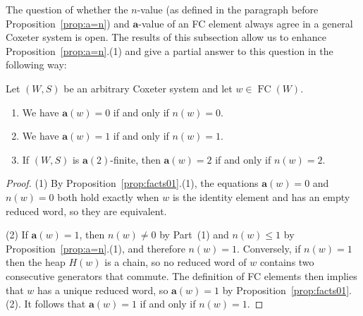 \documentclass[ALCO,Unicode,published]{cedram}
\newcommand{\la}{\mathbf{a}}
\DeclareMathOperator{\fc}{\mathrm{FC}}
\begin{document}
    \begin{remark}
      \label{rmk:a.vs.n}
      The question of whether the $n$-value (as defined in the paragraph before Proposition~\ref{prop:a=n}) and
      $\la$-value of an FC element always agree in a general Coxeter system is open. The results of
      this subsection allow us to enhance Proposition~\ref{prop:a=n}.(1) and give a partial answer to this
      question in the following way: 

\begin{prop} 
\label{prop:a.vs.n}
Let $(W,S)$ be an arbitrary Coxeter system and let $w\in \fc(W)$.  \begin{enumerate} \item We
   have $\la(w)=0$ if and only if $n(w)=0$.  \item We have $\la(w)=1$ if and only if
   $n(w)=1$.
\item If $(W,S)$ is $\la(2)$-finite, then $\la(w)=2$ if and only if $n(w)=2$.  \end{enumerate}
  \end{prop} 
\begin{proof} (1) By Proposition~\ref{prop:facts01}.(1), the equations $\la(w)=0$ and $n(w)=0$ both hold
     exactly when $w$ is the identity element and has an empty reduced word, so they are
     equivalent.

(2) If $\la(w)=1$, then $n(w)\neq 0$ by Part~(1) and $n(w)\le 1$ by Proposition~\ref{prop:a=n}.(1), and
therefore $n(w)=1$.  Conversely, if $n(w)=1$ then the heap $H(w)$ is a chain, so no reduced word
of $w$ contains two consecutive generators that commute. The definition of FC elements then
implies that $w$ has a unique reduced word, so $\la(w)=1$ by Proposition~\ref{prop:facts01}.(2). It follows
that $\la(w)=1$ if and only if $n(w)=1$.


\end{proof}
\end{remark}
\end{document}
